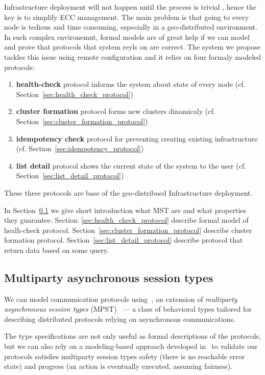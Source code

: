 Infrastructure deployment will not happen until the process is trivial \cite{SatyanarayananBCD09}, hence the key is to simplify ECC management. The main problem is that going to every node is tedious and time consuming, especially in a geo-distributed environment. In such complex environemnt, formal models are of great help if we can model and prove that protocols that system reyls on are correct. The system we propose tackles this issue using remote configuration and it relies on four formaly modeled protocols: 

\begin{enumerate}[start=1,label={(\bfseries \arabic*)}]
	\item \textbf{health-check} protocol informs the system about state of every node (cf. Section~\ref{sec:health_check_protocol})
	\item \textbf{cluster formation} protocol forms new clusters dinamicaly (cf. Section~\ref{sec:cluster_formation_protocol})
	\item \textbf{idempotency check} protocol for preventing creating existing infrastructure (cf. Section~\ref{sec:idempotency_protocol})
	\item \textbf{list detail} protocol shows the current state of the system to the user (cf. Section~\ref{sec:list_detail_protocol})
\end{enumerate}

These three protocols are base of the geo-distribued Infrastructure deployment.

In Section~\ref{sec:multiparty} we give short introduction what MST are and what properties they guarantee. Section~\ref{sec:health_check_protocol} describe formal model of healh-check protocol. Section~\ref{sec:cluster_formation_protocol} describe cluster formation protocol. Section~\ref{sec:list_detail_protocol} describe protocol that return data based on some query.
%
%
\subsection{Multiparty asynchronous session types}\label{sec:multiparty}
%
We can model communication protocols %
using~\cite{HuY17}, an extension of \emph{multiparty asynchronous session types} (MPST)~\cite{HondaYC08} %
--- a class of behavioral types tailored for describing distributed protocols relying on asynchronous
communications. 

The type specifications are not only useful as formal descriptions of the protocols, but we can also rely on a modeling-based approach developed in~\cite{HuY17} to validate our protocols satisfies multiparty session types safety (there is no reachable error state) and progress (an action is eventually executed, assuming
fairness). %

